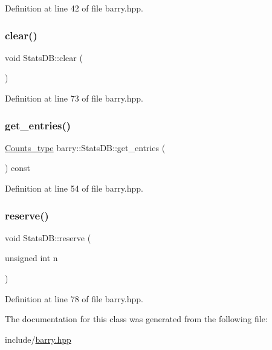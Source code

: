 Definition at line 42 of file barry.\+hpp.

\mbox{\label{classbarry_1_1_stats_d_b_a5de68def55b0a3b99a8f609815624a00}} 
\subsubsection{\texorpdfstring{clear()}{clear()}}
{\footnotesize\ttfamily void Stats\+D\+B\+::clear (\begin{DoxyParamCaption}{ }\end{DoxyParamCaption})\hspace{0.3cm}{\ttfamily [inline]}}



Definition at line 73 of file barry.\+hpp.

\mbox{\label{classbarry_1_1_stats_d_b_a396e0921c34a854320a8027ce0f29278}} 
\subsubsection{\texorpdfstring{get\+\_\+entries()}{get\_entries()}}
{\footnotesize\ttfamily \hyperlink{namespacebarry_a3e2d8c3b6cf602107559d4237d9f1315}{Counts\+\_\+type} barry\+::\+Stats\+D\+B\+::get\+\_\+entries (\begin{DoxyParamCaption}{ }\end{DoxyParamCaption}) const\hspace{0.3cm}{\ttfamily [inline]}}



Definition at line 54 of file barry.\+hpp.

\mbox{\label{classbarry_1_1_stats_d_b_a3370b7f2fb16aa047f8a938232a98602}} 
\subsubsection{\texorpdfstring{reserve()}{reserve()}}
{\footnotesize\ttfamily void Stats\+D\+B\+::reserve (\begin{DoxyParamCaption}\item[{unsigned int}]{n }\end{DoxyParamCaption})\hspace{0.3cm}{\ttfamily [inline]}}



Definition at line 78 of file barry.\+hpp.



The documentation for this class was generated from the following file\+:\begin{DoxyCompactItemize}
\item 
include/\hyperlink{barry_8hpp}{barry.\+hpp}\end{DoxyCompactItemize}
